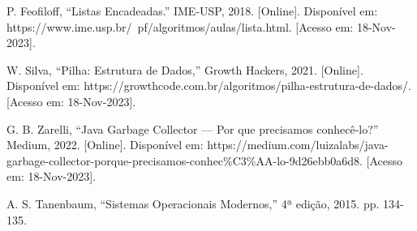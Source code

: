  P. Feofiloff, ``Listas Encadeadas.'' IME-USP, 2018. [Online]. Disponível em: https://www.ime.usp.br/~pf/algoritmos/aulas/lista.html. [Acesso em: 18-Nov-2023].

 W. Silva, ``Pilha: Estrutura de Dados,'' Growth Hackers, 2021. [Online]. Disponível em: https://growthcode.com.br/algoritmos/pilha-estrutura-de-dados/. [Acesso em: 18-Nov-2023].

 G. B. Zarelli, ``Java Garbage Collector — Por que precisamos conhecê-lo?'' Medium, 2022. [Online]. Disponível em: https://medium.com/luizalabs/java-garbage-collector-porque-precisamos-conhec\%C3\%AA-lo-9d26ebb0a6d8. [Acesso em: 18-Nov-2023].

 A. S. Tanenbaum, ``Sistemas Operacionais Modernos,'' 4ª edição, 2015. pp. 134-135.
